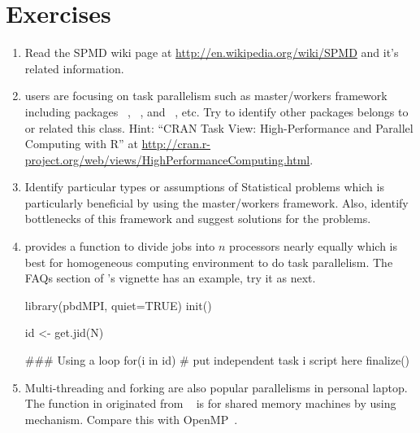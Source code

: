 \section{Exercises}
\label{sec:background}

\begin{enumerate}[label=\thechapter-\arabic*]
\item
Read the SPMD wiki page at
\url{http://en.wikipedia.org/wiki/SPMD}
and it's related information.

\item
{} users are focusing on task parallelism such as
master/workers framework
including packages
~\citep{Tierney2012},
~\citep{parallel}, and
~\citep{Rmpi}, etc.
Try to identify other packages belongs to or related this class.
{\color{blue}Hint:
``CRAN Task View: High-Performance and Parallel Computing with R'' at
\url{http://cran.r-project.org/web/views/HighPerformanceComputing.html}.
}

\item
Identify particular types or assumptions of Statistical problems which is
particularly beneficial by using the master/workers framework.
Also, identify bottlenecks of this framework and suggest solutions
for the problems.

\item
{} provides a function 
to divide  jobs into $n$ processors nearly equally which is best
for homogeneous computing environment to do task parallelism.
The FAQs section of 's vignette has an example, try it as next.
\begin{Code}
library(pbdMPI, quiet=TRUE)
init()

id <- get.jid(N)

### Using a loop
for(i in id){
  # put independent task i script here
}
finalize()
\end{Code}

\item
Multi-threading
and forking
are also popular parallelisms in personal laptop.
The function 
in  originated
from ~\citep{multicore}
is for shared memory machines by using
 mechanism.
Compare this with OpenMP~\citep{OpenMP}.


\end{enumerate}

